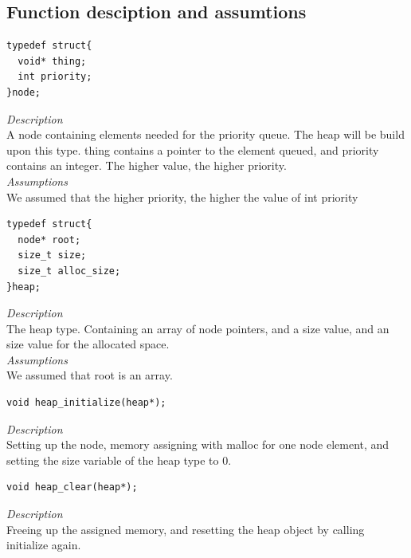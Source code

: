 \documentclass[11pt]{article}
\begin{document}
\subsection*{Function desciption and assumtions}
\begin{lstlisting}[style=customc]
typedef struct{
  void* thing;
  int priority;
}node;
\end{lstlisting}

\textit{Description}\\
A node containing elements needed for the priority queue. The heap will be build
upon this type. thing contains a pointer to the element queued, and priority
contains an integer. The higher value, the higher priority.\\
\textit{Assumptions}\\
We assumed that the higher priority, the higher the value of int priority\\


\begin{lstlisting}[style=customc]
typedef struct{
  node* root;
  size_t size;
  size_t alloc_size;
}heap;
\end{lstlisting}
\textit{Description}\\
The heap type. Containing an array of node pointers, and a size value, and an size value for the allocated space.\\
\textit{Assumptions}\\
We assumed that root is an array.\\



\begin{lstlisting}[style=customc]
void heap_initialize(heap*);\end{lstlisting}
\textit{Description}\\
Setting up the node, memory assigning with malloc for one node element, and setting
the size variable of the heap type to 0.\\







\begin{lstlisting}[style=customc]
void heap_clear(heap*); \end{lstlisting}
\textit{Description}\\
Freeing up the assigned memory, and resetting the heap object by calling initialize again.\\
\end{document}
